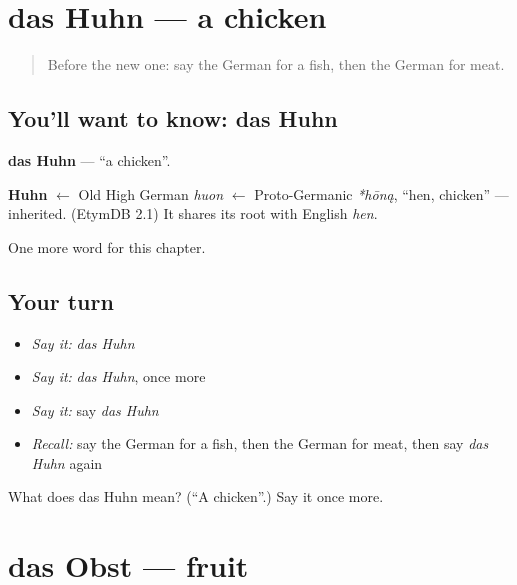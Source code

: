 \section[das Huhn]{das Huhn — a chicken}

\label{lesson:GE-C69-huhn}



\begin{quote}
Before the new one: say the German for a fish, then the German for meat.
\end{quote}

\subsection*{You'll want to know: das Huhn}
\textbf{das Huhn} — \textquotedblleft{}a chicken\textquotedblright{}.

\begin{cousinweb}
\textbf{Huhn} $\leftarrow$ Old High German \emph{huon} $\leftarrow$ Proto-Germanic \emph{*hōną}, \textquotedblleft{}hen, chicken\textquotedblright{} — inherited. (EtymDB 2.1) It shares its root with English \emph{hen}.
\end{cousinweb}

\begin{grammarlens}[title={What you've built}]
One more word for this chapter.
\end{grammarlens}

\subsection*{Your turn}
\begin{itemize}
\raggedright
  \item \emph{Say it:} \emph{das Huhn}
  \item \emph{Say it:} \emph{das Huhn}, once more
  \item \emph{Say it:} say \emph{das Huhn}
  \item \emph{Recall:} say the German for a fish, then the German for meat, then say \emph{das Huhn} again
\end{itemize}

\begin{tcolorbox}[breakable,colback=teal!4,colframe=teal!35!black,title={Before you move on}]
What does das Huhn mean? (\textquotedblleft{}A chicken\textquotedblright{}.) Say it once more.
\end{tcolorbox}
\section[das Obst]{das Obst — fruit}

